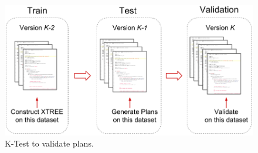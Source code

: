 \begin{figure}[!t]
\includegraphics[width=\linewidth]{images/k_test.png}
\caption{K-Test to validate plans.}\label{fig:design}
\end{figure}